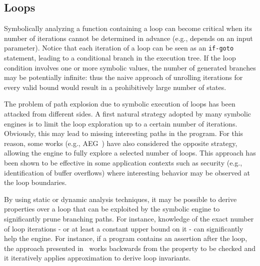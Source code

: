 
\subsection{Loops}
\label{ss:loops}

Symbolically analyzing a function containing a loop can become critical when its number of iterations cannot be determined in advance (e.g., depends on an input parameter). Notice that each iteration of a loop can be seen as an {\tt if-goto} statement, leading to a conditional branch in the execution tree. If the loop condition involves one or more symbolic values, the number of generated branches may be potentially infinite: thus the naive approach of unrolling iterations for every valid bound would result in a prohibitively large number of states.


The problem of path explosion due to symbolic execution of loops has been attacked from different sides. A first natural strategy adopted by many symbolic engines is to limit the loop exploration up to a certain number of iterations. Obviously, this may lead to missing interesting paths in the program. For this reason, some works (e.g., {\sc AEG}~\cite{AEG-NDSS11}) have also considered the opposite strategy, allowing the engine to fully explore a selected number of loops. This approach has been shown to be effective in some application contexts such as security (e.g., identification of buffer overflows) where interesting behavior may be observed at the loop boundaries.

By using static or dynamic analysis techniques, it may be possible to derive properties over a loop that can be exploited by the symbolic engine to significantly prune branching paths. For instance, knowledge of the exact number of loop iterations - or at least a constant upper bound on it - can significantly help the engine. For instance, if a program contains an assertion after the loop, the approach presented in~\cite{PV-SPIN04} works backwards from the property to be checked and it iteratively applies approximation to derive loop invariants. %

